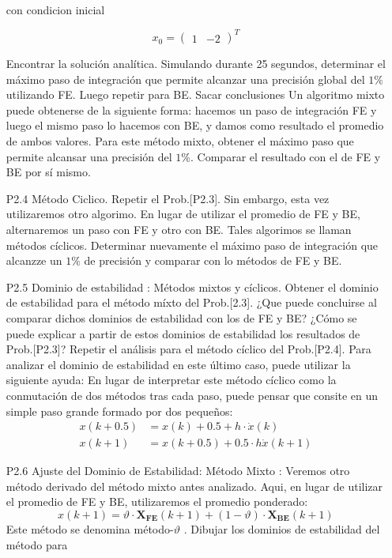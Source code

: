 \documentclass{article}
\begin{document}
\begin{itemize}
con condicion inicial

\begin{equation}
x_0 = \begin{pmatrix} 1 & -2\end{pmatrix}^T
 \label{P2.3b} \tag{P2.3b}
\end{equation}

Encontrar la solución analítica. Simulando durante 25 segundos, determinar el máximo paso de integración que permite alcanzar una precisión global del $1\%$ utilizando FE. Luego repetir para BE. Sacar conclusiones
Un algoritmo mixto puede obtenerse de la siguiente forma: hacemos un paso de integración FE y luego el mismo paso lo hacemos con BE, y damos como resultado el promedio de ambos valores. Para este método mixto, obtener el máximo paso que permite alcansar una precisión del $1\%$. Comparar el resultado con el de FE y BE por sí mismo.
\item[P2.4] Método Ciclico. Repetir el Prob.[P2.3]. Sin embargo, esta vez utilizaremos otro algorimo. En lugar de utilizar el promedio de FE y BE, alternaremos un paso con FE y otro con BE. Tales algorimos se llaman métodos cíclicos.
Determinar nuevamente el máximo paso de integración que alcanzze un $1\%$ de precisión y comparar con lo métodos de FE y BE.
\item[P2.5] Dominio de estabilidad : Métodos mixtos y cíclicos. Obtener el dominio de estabilidad para el método míxto del Prob.[2.3]. ¿Que puede concluirse al comparar dichos dominios de estabilidad con los de FE y BE? ¿Cómo se puede explicar a partir de estos dominios de estabilidad los resultados de Prob.[P2.3]?
Repetir el análisis para el método cíclico del Prob.[P2.4]. Para analizar el dominio de estabilidad en este último caso, puede utilizar la siguiente ayuda:
En lugar de interpretar este método cíclico como la conmutación de dos métodos tras cada paso, puede pensar que consite en un simple paso grande formado por dos pequeños:
\begin{align}
	x(k+0.5) &= x(k) + 0.5 + h \cdot \dot{x}(k) \tag{P2.5a} \\
	x(k+1)   &= x(k + 0.5) + 0.5 \cdot h \dot{x}(k+1) \tag{P2.5b}
\end{align}
\item[P2.6] Ajuste del Dominio de Estabilidad: Método Mixto : Veremos otro método derivado del método mixto antes analizado. Aqui, en lugar de utilizar el promedio de FE y BE, utilizaremos el promedio ponderado:
\begin{equation}
x(k+1) = \vartheta \cdot \boldsymbol{X_{FE}}(k + 1) + (1 - \vartheta) \cdot \boldsymbol{X_{BE}}(k + 1)
\tag{P2.6a}
\end{equation}
Este método se denomina método-$\vartheta$ . Dibujar los dominios de estabilidad del método para


\end{itemize}
\end{document}
